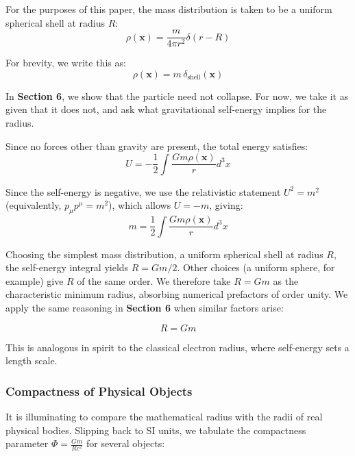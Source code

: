 \documentclass {article}
\renewcommand\vec{\mathbf}
\begin{document}
For the purposes of this paper, the mass distribution is taken to be a uniform spherical shell at radius $R$:
\begin{equation}
\rho(\vec{x}) = \frac{m}{4\pi r^2} \delta(r - R)
\end{equation}

For brevity, we write this as:
\begin{equation}
\rho(\vec{x}) = m \, \delta_{\text{shell}}(\vec{x})
\label{eq:delta_shell}
\end{equation}

In \textbf{Section 6}, we show that the particle need not collapse. For now, we take it as given that it does not, and ask what gravitational self-energy implies for the radius.

Since no forces other than gravity are present, the total energy satisfies:
\begin{equation}
U = -\frac{1}{2} \int \frac{Gm \rho(\vec{x})}{r} d^3x
\end{equation}

Since the self-energy is negative, we use the relativistic statement $U^2 = m^2$ (equivalently, $p_\mu p^\mu = m^2$), which allows $U = -m$, giving:
\begin{equation}
m = \frac{1}{2} \int \frac{Gm \rho(\vec{x})}{r} d^3x
\end{equation}

Choosing the simplest mass distribution, a uniform spherical shell at radius $R$, the self-energy integral yields $R = Gm/2$. Other choices (a uniform sphere, for example) give $R$ of the same order. We therefore take $R = Gm$ as the characteristic minimum radius, absorbing numerical prefactors of order unity. We apply the same reasoning in \textbf{Section 6} when similar factors arise:

\begin{equation}
\boxed{R = Gm}
\label{eq:radius}
\end{equation}

This is analogous in spirit to the classical electron radius, where self-energy sets a length scale.



\subsubsection{Compactness of Physical Objects}

It is illuminating to compare the mathematical radius with the radii of real physical bodies. Slipping back to SI units, we tabulate the compactness parameter $\Phi = \frac{Gm}{Rc^2}$ for several objects:
\end{document}
